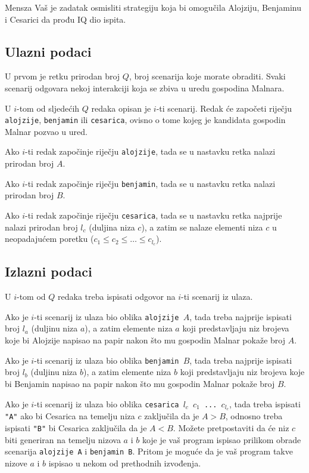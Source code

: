 \begin{statement}[
  problempoints=100,
  timelimit=1 sekunda,
  memorylimit=512 MiB,
]{Mensza}
Vaš je zadatak osmisliti strategiju koja bi omogučila Alojziju, Benjaminu i
Cesarici da prođu IQ dio ispita.

\subsection*{Ulazni podaci}
U prvom je retku prirodan broj $Q$, broj scenarija koje morate obraditi. Svaki
scenarij odgovara nekoj interakciji koja se zbiva u uredu gospodina Malnara.

U $i$-tom od sljedećih $Q$ redaka opisan je $i$-ti scenarij. Redak će započeti
riječju \texttt{alojzije}, \texttt{benjamin} ili \texttt{cesarica}, ovisno o
tome kojeg je kandidata gospodin Malnar pozvao u ured.

Ako $i$-ti redak započinje riječju \texttt{alojzije}, tada se u nastavku retka
nalazi prirodan broj $A$.

Ako $i$-ti redak započinje riječju \texttt{benjamin}, tada se u nastavku retka
nalazi prirodan broj $B$.

Ako $i$-ti redak započinje riječju \texttt{cesarica}, tada se u nastavku retka
najprije nalazi prirodan broj $l_c$ (duljina niza $c$), a zatim se nalaze
elementi niza $c$ u neopadajućem poretku ($c_1 \le c_2 \le \ldots \le c_{l_c}$).

\subsection*{Izlazni podaci}
U $i$-tom od $Q$ redaka treba ispisati odgovor na $i$-ti scenarij iz ulaza.

Ako je $i$-ti scenarij iz ulaza bio oblika \texttt{alojzije $A$}, tada treba
najprije ispisati broj $l_a$ (duljinu niza $a$), a zatim elemente niza $a$ koji
predstavljaju niz brojeva koje bi Alojzije napisao na papir nakon što mu gospodin
Malnar pokaže broj $A$.

Ako je $i$-ti scenarij iz ulaza bio oblika \texttt{benjamin $B$}, tada treba
najprije ispisati broj $l_b$ (duljinu niza $b$), a zatim elemente niza $b$ koji
predstavljaju niz brojeva koje bi Benjamin napisao na papir nakon što mu gospodin
Malnar pokaže broj $B$.

Ako je $i$-ti scenarij iz ulaza bio oblika \texttt{cesarica $l_c$ $c_1$ ...
$c_{l_c}$}, tada treba ispisati \texttt{"A"} ako bi Cesarica na temelju niza
$c$ zaključila da je $A > B$, odnosno treba ispisati \texttt{"B"} bi Cesarica
zaključila da je $A < B$. Možete pretpostaviti da će niz $c$ biti generiran na
temelju nizova $a$ i $b$ koje je vaš program ispisao prilikom obrade scenarija
\texttt{alojzije A} i \texttt{benjamin B}. Pritom je moguće da je vaš program
takve nizove $a$ i $b$ ispisao u nekom od prethodnih izvođenja.


\end{statement}
